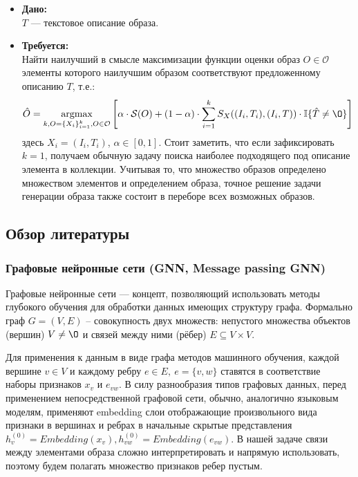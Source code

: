 \documentclass[a4paper,14pt]{extarticle}
\DeclareMathOperator*{\argmax}{argmax}
\begin{document}
				\begin{itemize}
					\item[] \textbf{Дано:}\\
					$T$ --- текстовое описание образа.
					
					\item[] \textbf{Требуется:}\\
					Найти наилучший в смысле максимизации функции оценки образ $O\in\mathcal{O}$ элементы которого наилучшим образом соответствуют предложенному описанию $T$, т.е.:
					$$ \hat{O} = \argmax_{k,O = \{X_i\}_{i=1}^{k},  O\in\mathcal{O}} \left[\alpha \cdot \mathcal{S}(O) + (1-\alpha) \cdot \sum\limits_{i=1}^{k} S_X((I_i, T_i), (I_i, T))\cdot\mathbb{I}\{\hat{T}\neq\O\}  \right]$$				
					здесь $X_i = (I_i, T_i)$, $\alpha\in[0,1]$. 
					Стоит заметить, что если зафиксировать $k=1$, получаем обычную задачу поиска наиболее подходящего под описание элемента в коллекции. Учитывая то, что множество образов определено множеством элементов и определением образа, точное решение задачи генерации образа также состоит в переборе всех возможных образов.
				\end{itemize}
			
		\subsection{Обзор литературы}
			\subsubsection{Графовые нейронные сети (GNN, Message passing GNN)}\label{GNN}
			 Графовые нейронные сети --- концепт, позволяющий использовать методы глубокого обучения для обработки данных имеющих структуру графа. Формально граф $G = (V, E)$ -- совокупность двух множеств: непустого множества объектов (вершин) $V\neq\O$ и связей между ними (рёбер) $E\subseteq V\times V$. 
			 
			 Для применения к данным в виде графа методов машинного обучения, каждой вершине $v\in V$ и каждому ребру $e\in E,~e = \{v, w\}$ ставятся в соответствие наборы признаков $x_v$ и $e_{vw}$. В силу разнообразия типов графовых данных, перед применением непосредственной графовой сети, обычно, аналогично языковым моделям, применяют embedding слои отображающие произвольного вида признаки в вершинах и ребрах в начальные скрытые представления $h_v^{(0)} = Embedding(x_v), h_{vw}^{(0)} = Embedding(e_{vw})$. В нашей задаче связи между элементами образа сложно интерпретировать и напрямую использовать, поэтому будем полагать множество признаков ребер пустым. 
			 
\end{document}
